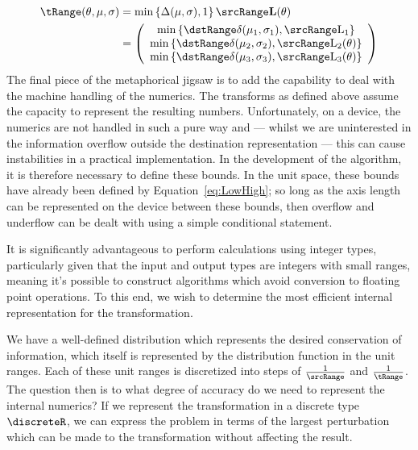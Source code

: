 \begin{equation}\label{eq:CombinedRotation}
\begin{aligned}
 \tRange(\theta,\mu,\sigma) &= \min\left\{\Delta(\mu,\sigma), 1 \right\} \srcRange \mathbf{L}(\theta) \\
 &= 
\left(
\begin{array}{c}
\min\left\{\dstRange \delta(\mu_1,\sigma_1), \srcRange \text{L}_1 \right\} \\
\min\left\{\dstRange \delta(\mu_2,\sigma_2), \srcRange \text{L}_2(\theta) \right\}  \\
\min\left\{\dstRange \delta(\mu_3,\sigma_3), \srcRange \text{L}_3(\theta) \right\}  \\
\end{array}
\right)
\end{aligned}
\end{equation}
The final piece of the metaphorical jigsaw is to add the capability to deal with the machine handling of the numerics. The transforms as defined above assume the capacity to represent the resulting numbers. Unfortunately, on a device, the numerics are not handled in such a pure way and --- whilst we are uninterested in the information overflow outside the destination representation --- this can cause instabilities in a practical implementation. In the development of the algorithm, it is therefore necessary to define these bounds. In the unit space, these bounds have already been defined by Equation~\ref{eq:LowHigh}; so long as the axis length can be represented on the device between these bounds, then overflow and underflow can be dealt with using a simple conditional statement.

It is significantly advantageous to perform calculations using integer types, particularly given that the input and output types are integers with small ranges, meaning it's possible to construct algorithms which avoid conversion to floating point operations. To this end, we wish to determine the most efficient internal representation for the transformation.

We have a well-defined distribution which represents the desired conservation of information, which itself is represented by the distribution function in the unit ranges. Each of these unit ranges is discretized into steps of $\frac{1}{\srcRange}$ and $\frac{1}{\tRange}$. The question then is to what degree of accuracy do we need to represent the internal numerics? If we represent the transformation in a discrete type $\discreteR$, we can express the problem in terms of the largest perturbation which can be made to the transformation without affecting the result.


